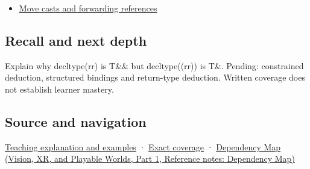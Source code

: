 \hypertarget{appendix-5d4252a42886-used-by}{}

\begin{itemize}
\tightlist
\item
  \hyperref[appendix-0104b704fb11]{Move casts and forwarding references}
\end{itemize}

\subsection{Recall and next depth}\label{appendix-5d4252a42886-recall-and-next-depth}

\hypertarget{appendix-5d4252a42886-recall-and-next-depth}{}

Explain why decltype(rr) is T\&\& but decltype((rr)) is T\&. Pending: constrained deduction, structured bindings and return-type deduction. Written coverage does not establish learner mastery.

\subsection{Source and navigation}\label{appendix-5d4252a42886-source-and-navigation}

\hypertarget{appendix-5d4252a42886-source-and-navigation}{}

\hyperref[01-foundations-i-ch003-an-expression-has-a-type-and-a-category]{Teaching explanation and examples} · \hyperref[appendix-fd090d982a15-m008---parts-113-126]{Exact coverage} · \href{../07-Vision-XR-and-Playable-Worlds-P01/main.pdf\#appendix-4ad47bdd269a}{Dependency Map (Vision, XR, and Playable Worlds, Part 1, Reference notes: Dependency Map)}

